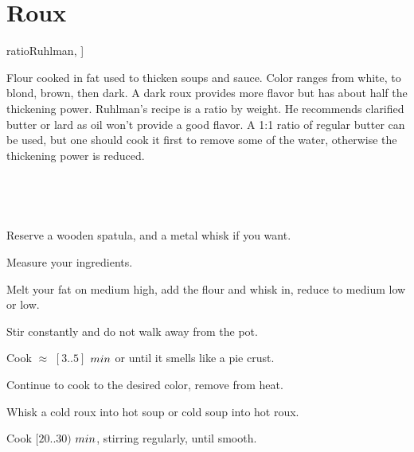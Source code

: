 \section[Roux]{Roux}


\begin{recipestats}[
	bakingtime=30~\minute,
	original=\citetitle{ratioRuhlman}~\cite[p.~113]{ratioRuhlman},
]
\end{recipestats}


\begin{recipeabstract}
	Flour cooked in fat used to thicken soups and sauce.
	Color ranges from white, to blond, brown, then dark.
	A dark roux provides more flavor but has about half the thickening power\cite{ratioRuhlman}.
	Ruhlman's recipe is a ratio by weight.
	He recommends clarified butter or lard as oil won't provide a good flavor.
	A 1:1 ratio of regular butter can be used, but one should cook it first to remove some of the water, otherwise the thickening power is reduced.
\end{recipeabstract}


\begin{ingredientcolumns}
	\begin{ingredientblock}[roux]
		\\
	\end{ingredientblock}

	\begin{ingredientblock}[thickening]
		\\
	\end{ingredientblock}
\end{ingredientcolumns}


\begin{preparation}
\item Reserve a wooden spatula, and a metal whisk if you want.
\item Measure your ingredients.
\item Melt your fat on medium high, add the flour and whisk in, reduce to medium low or low.
\item Stir constantly and do not walk away from the pot.
\item Cook $\approx$ $[3..5]$ $\minute$ or until it smells like a pie crust.
\item Continue to cook to the desired color, remove from heat.
\item Whisk a cold roux into hot soup or cold soup into hot roux.
\item Cook $[20..30)$ $\minute$, stirring regularly, until smooth.
\end{preparation}


